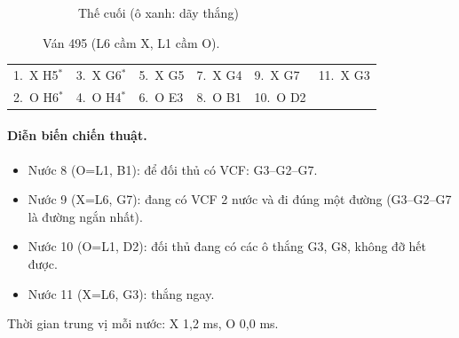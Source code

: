 \begin{figure}[H]
\begin{subfigure}[t]{.48\linewidth}
    \caption{Thế cuối (ô xanh: dãy thắng)}
  \end{subfigure}
  \caption{Ván 495 (L6 cầm X, L1 cầm O).}
  \label{fig:cs-van-05}
\end{figure}
{\footnotesize\linespread{1}\selectfont
\noindent\begin{tabularx}{\linewidth}{*{6}{X}}
\toprule
1.~X H5$^\ast$ & 3.~X G6$^\ast$ & 5.~X G5 & 7.~X G4 & 9.~X G7 & 11.~X G3 \\
2.~O H6$^\ast$ & 4.~O H4$^\ast$ & 6.~O E3 & 8.~O B1 & 10.~O D2 &  \\
\bottomrule
\end{tabularx}\par}
\paragraph{Diễn biến chiến thuật.}
\begin{itemize}\footnotesize\linespread{1.1}\selectfont
\setlength{\itemsep}{0pt}
  \item Nước 8 (O=L1, B1): để đối thủ có VCF: G3--G2--G7.
  \item Nước 9 (X=L6, G7): đang có VCF 2 nước và đi đúng một đường (G3--G2--G7 là đường ngắn nhất).
  \item Nước 10 (O=L1, D2): đối thủ đang có các ô thắng G3, G8, không đỡ hết được.
  \item Nước 11 (X=L6, G3): thắng ngay.
\end{itemize}
Thời gian trung vị mỗi nước: X 1,2 ms, O 0,0 ms.
\clearpage

